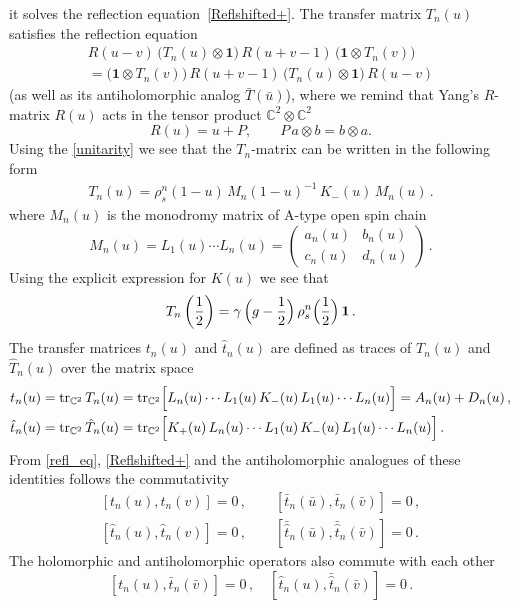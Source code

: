 \documentclass[a4paper,11pt]{article}
\newcommand{\tr}{\mathop{\rm tr}\nolimits}
\numberwithin{equation}{section}
\begin{document}
it solves the reflection equation~\eqref{Reflshifted+}.
The transfer matrix $T_n(u)$ satisfies the reflection equation \cite{Ch,Skl:Boundary,KS,PP}
\begin{multline}\label{refl_eq}
	R(u-v)\, \bigl(T_n(u)\otimes \bm{1}\bigr)\,R(u+v-1)\, \bigl(\bm{1} \otimes T_n(v)\bigr) \\[6pt]
	= \bigl(\bm{1} \otimes T_n(v)\bigr)\,R(u+v-1)\,\bigl(T_n(u)\otimes \bm{1}\bigr)\, R(u-v)
\end{multline}
(as well as its antiholomorphic analog $\bar{T}(\bar{u})$),
where we remind that Yang's $R$-matrix $R(u)$ acts in the tensor product $\mathbb{C}^2\otimes \mathbb{C}^2$
\begin{equation} \label{Rmat}
	R(u) = u  + P, \qquad P \, a \otimes b = b \otimes a.
\end{equation}
Using the \eqref{unitarity} we see that the $T_n$-matrix can be written in the following form
\begin{align*}
	T_n(u) = \rho_s^n(1-u) \, M_n(1-u)^{-1} \, K_-(u) \, M_n(u) \,.
\end{align*}
where $M_n(u)$ is the monodromy matrix of A-type open spin chain~\cite{DKM,ADV1}
\begin{equation} \nonumber
	M_n(u) = L_1(u) \cdots L_n(u) = \begin{pmatrix}
		a_n(u) & b_n(u) \\
		c_n(u) & d_n(u)
	\end{pmatrix} \,.
\end{equation}
Using the explicit expression for $K(u)$ we see that
\begin{equation} \label{T_n(1/2)}
	T_n\left(\frac{1}{2}\right) = \gamma \, \Bigl(g-\frac{1}{2}\Bigr) \, \rho_s^n\Bigl(\frac{1}{2}\Bigr) \, \bm{1} \,.
\end{equation}	
The transfer matrices $t_n(u)$ and $\hat{t}_n(u)$ are defined as traces of $T_n(u)$ and $\hat{T}_n(u)$ over the matrix space
\begin{align}
	& \nonumber
	t_n(u) = \tr_{\mathbb{C}^2} T_n(u)
	= \tr_{\mathbb{C}^2}\Bigl[L_n(u) \cdots L_1(u)\,K_-(u)\,L_1(u) \cdots L_n(u)\Bigr]
	= A_n(u)+D_n(u) \,, \\
	& \nonumber
	\hat{t}_n(u) = \tr_{\mathbb{C}^2} \hat{T}_n(u)
	= \tr_{\mathbb{C}^2}\Bigl[K_+(u)\,L_n(u) \cdots L_1(u)\,K_-(u)\,L_1(u) \cdots L_n(u)\Bigr] \,.
\end{align}
From \eqref{refl_eq}, \eqref{Reflshifted+} and the antiholomorphic analogues of these identities follows the commutativity~\cite[Section~3]{Skl:Boundary}
\begin{align} \nonumber
	[t_n(u), t_n(v)] = 0 \,, \qquad [\bar{t}_n(\bar{u}), \bar{t}_n(\bar{v})] = 0 \,, \\
	[\hat{t}_n(u), \hat{t}_n(v)] = 0 \,, \qquad [\bar{\hat{t}}_n(\bar{u}), \bar{\hat{t}}_n(\bar{v})] = 0 \,.
\end{align}
The holomorphic and antiholomorphic operators also commute with each other
\begin{equation} \nonumber
	[t_n(u), \bar{t}_n(\bar{v})] = 0 \,, \quad [\hat{t}_n(u), \bar{\hat{t}}_n(\bar{v})] = 0 \,.
\end{equation}
\end{document}
